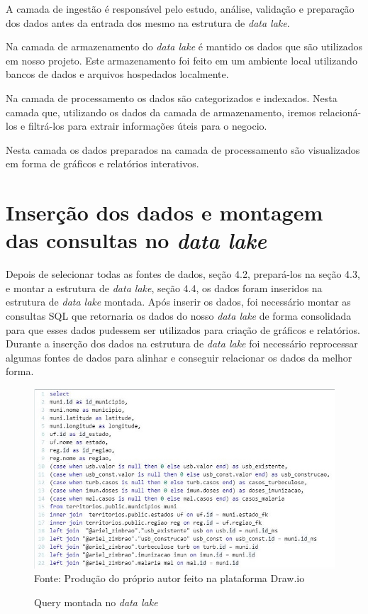 \documentclass[
	12pt,				%
	openright,			%
	oneside,			%
	a4paper,			%
	chapter=TITLE,		%
	section=TITLE,		%
	subsection=TITLE,	%
	subsubsection=TITLE,%
	english,			%
	brazil				%
	]{abntex2}
\theoremstyle{definition}
\begin{document}
    \begin{description}[font=$\bullet$~\normalfont\scshape\color{black!50!black}]
    \item [Camada de Ingestão] A camada de ingestão é responsável pelo estudo, análise, validação e preparação dos dados antes da entrada dos mesmo na estrutura de \textit{data lake}.   
    \item [Camada de Armazenamento] Na camada de armazenamento do \textit{data lake} é mantido os dados que são utilizados em nosso projeto. Este armazenamento foi feito em um ambiente local utilizando bancos de dados e arquivos hospedados localmente. 
    \item [Camada de Processamento] Na camada de processamento os dados são categorizados e indexados. Nesta camada que, utilizando os dados da camada de armazenamento, iremos relacioná-los e filtrá-los para extrair informações úteis para o negocio. 
    \item [Camada de Visualização] Nesta camada os dados preparados na camada de processamento são visualizados em forma de gráficos e relatórios interativos. 
    \end{description}

\section{Inserção dos dados e montagem das consultas no \textit{data lake}}
    
    Depois de selecionar todas as fontes de dados, seção 4.2, prepará-los na seção 4.3, e montar a estrutura de \textit{data lake}, seção 4.4, os dados foram inseridos na estrutura de \textit{data lake} montada. Após inserir os dados, foi necessário montar as consultas SQL que retornaria os dados do nosso \textit{data lake} de forma consolidada para que esses dados pudessem ser utilizados para criação de gráficos e relatórios. Durante a inserção dos dados na estrutura de \textit{data lake} foi necessário reprocessar algumas fontes de dados para alinhar e conseguir relacionar os dados da melhor forma.
    
    \begin{figure}[H]
         \centering
         \caption{Query montada no \textit{data lake}}
         \includegraphics[scale=1.1]{imagens/query.JPG}
         \\{\footnotesize Fonte: Produção do próprio autor feito na plataforma Draw.io}
         \label{estrura data lake}
    \end{figure}
    
\end{document}
